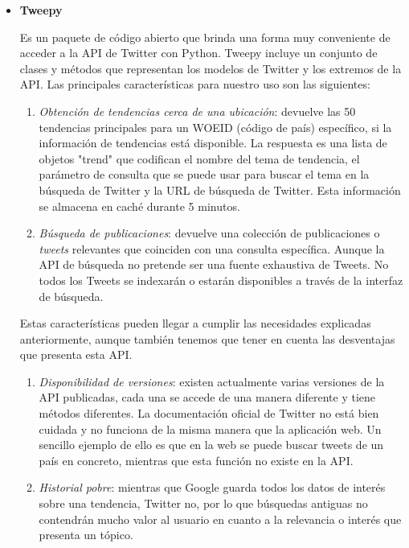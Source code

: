 \begin{itemize}
    \item
    \textbf{Tweepy} \cite{tweepy-manual}
    
    Es un paquete de código abierto que brinda una forma muy conveniente de acceder a la API de Twitter con Python. Tweepy incluye un conjunto de clases y métodos que representan los modelos de Twitter y los extremos de la API. Las principales características para nuestro uso son las siguientes:
    \begin{enumerate}
    \item \textit{Obtención de tendencias cerca de una ubicación}: devuelve las 50 tendencias principales para un WOEID (código de país) específico, si la información de tendencias está disponible. La respuesta es una lista de objetos "trend" que codifican el nombre del tema de tendencia, el parámetro de consulta que se puede usar para buscar el tema en la búsqueda de Twitter y la URL de búsqueda de Twitter. Esta información se almacena en caché durante 5 minutos.
    \item \textit{Búsqueda de publicaciones}: devuelve una colección de publicaciones o \textit{tweets} relevantes que coinciden con una consulta específica. Aunque la API de búsqueda no pretende ser una fuente exhaustiva de Tweets. No todos los Tweets se indexarán o estarán disponibles a través de la interfaz de búsqueda.
    \end{enumerate}

    Estas características pueden llegar a cumplir las necesidades explicadas anteriormente, aunque también tenemos que tener en cuenta las desventajas que presenta esta API.

    \begin{enumerate}
    \item \textit{Disponibilidad de versiones}: existen actualmente varias versiones de la API publicadas, cada una se accede de una manera diferente y tiene métodos diferentes. La documentación oficial de Twitter no está bien cuidada y no funciona de la misma manera que la aplicación web. Un sencillo ejemplo de ello es que en la web se puede buscar tweets de un país en concreto, mientras que esta función no existe en la API.
    \item \textit{Historial pobre}: mientras que Google guarda todos los datos de interés sobre una tendencia, Twitter no, por lo que búsquedas antiguas no contendrán mucho valor al usuario en cuanto a la relevancia o interés que presenta un tópico.
    \end{enumerate}

\end{itemize}


